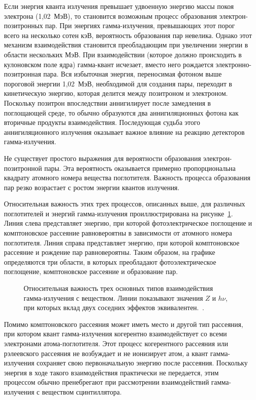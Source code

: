 Если энергия кванта излучения превышает удвоенную энергию массы покоя электрона (1,02~МэВ), то становится возможным процесс образования электрон-позитронных пар. При энергиях гамма-излучения, превышающих этот порог всего на несколько сотен кэВ, вероятность образования пар невелика. Однако этот механизм взаимодействия становится преобладающим при увеличении энергии в области нескольких МэВ. При взаимодействии (которое должно происходить в кулоновском поле ядра) гамма-квант исчезает, вместо него рождается электронно-позитронная пара. Вся избыточная энергия, переносимая фотоном выше пороговой энергии 1,02~МэВ, необходимой для создания пары, переходит в кинетическую энергию, которая делится между позитроном и электроном. Поскольку позитрон впоследствии аннигилирует после замедления в поглощающей среде, то обычно образуются два аннигиляционных фотона как вторичные продукты взаимодействия. Последующая судьба этого аннигиляционного излучения оказывает важное влияние на реакцию детекторов гамма-излучения.~\cite{Knoll2010}

Не существует простого выражения для вероятности образования электрон-позитронной пары. Эта вероятность оказывается примерно пропорциональна квадрату атомного номера вещества поглотителя. Важность процесса образования пар резко возрастает с ростом энергии квантов излучения.~\cite{Knoll2010}

Относительная важность этих трех процессов, описанных выше, для различных поглотителей и энергий гамма-излучения проиллюстрирована на рисунке~\ref{fig:gammaProcessesImpotance}. Линия слева представляет энергию, при которой фотоэлектрическое поглощение и комптоновское рассеяние равновероятны в зависимости от атомного номера поглотителя. Линия справа представляет энергию, при которой комптоновское рассеяние и рождение пар равновероятны. Таким образом, на графике определяются три области, в которых преобладают фотоэлектрическое поглощение, комптоновское рассеяние и образование пар.~\cite{Knoll2010}

\begin{figure}[ht]
  \caption{ Относительная важность трех основных типов взаимодействия гамма-излучения с веществом. Линии показывают значения $Z$ и $h \nu$, при которых вклад двух соседних эффектов эквивалентен.~\cite{Evans1955}.}
  \label{fig:gammaProcessesImpotance}
\end{figure}

Помимо комптоновского рассеяния может иметь место и другой тип рассеяния, при котором квант гамма-излучения когерентно взаимодействует со всеми электронами атома-поглотителя. Этот процесс когерентного рассеяния или рэлеевского рассеяния не возбуждает и не ионизирует атом, а квант гамма-излучения сохраняет свою первоначальную энергию после рассеяния. Поскольку энергия в ходе такого взаимодействия практически не передается, этим процессом обычно пренебрегают при рассмотрении взаимодействий гамма-излучения с веществом сцинтиллятора.~\cite{Knoll2010}

